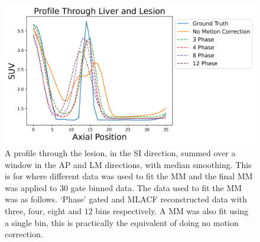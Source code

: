             \begin{figure}
                \centering
                
                \includegraphics[width=1.0\linewidth]{figures/motion_correction_2_results_2_phase_profile.png}
                
                \captionsetup{singlelinecheck=false}
                \caption{
                    A profile through the lesion, in the \gls{SI} direction, summed over a window in the \gls{AP} and \gls{LM} directions, with median smoothing. This is for where different data was used to fit the \gls{MM} and the final \gls{MM} was applied to $30$ gate binned data. The data used to fit the \gls{MM} was as follows. `Phase' gated and \gls{MLACF} reconstructed data with three, four, eight and $12$ bins respectively. A \gls{MM} was also fit using a single bin, this is practically the equivalent of doing no motion correction.
                }
                
                \label{fig:evaluation_of_pet_ct_motion_correction_incorporating_motion_models_using_mlacf_and_complex_gating_schemes_results_phase_profile}
            \end{figure}

